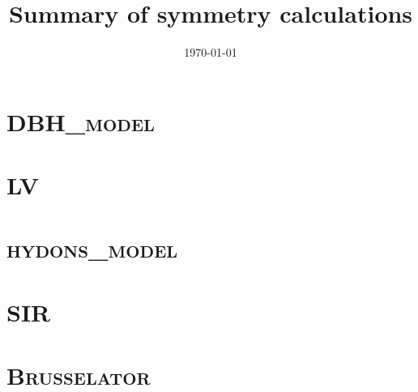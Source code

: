 \documentclass{book}
\begin{document}
\title{\textbf{Summary of symmetry calculations}}
\date{\today}
\maketitle
\tableofcontents
\clearpage
\chapter{\textsc{DBH\_model}}


\chapter{\textsc{LV}}


\chapter{\textsc{hydons\_model}}


\chapter{\textsc{SIR}}


\chapter{\textsc{Brusselator}}

\end{document}
